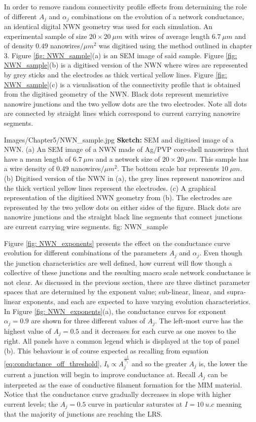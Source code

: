 In order to remove random connectivity profile effects from determining the role of different $A_j$ and $\alpha_j$ combinations on the evolution of a network conductance, an identical digital NWN geometry was used for each simulation. An experimental sample of size $ 20\times 20~ \mu m$ with wires of average length $6.7 ~ \mu m $ and of density $0.49$ nanowires$/\mu m^2$ was digitised using the method outlined in chapter 3. Figure \ref{fig: NWN_sample}(a) is an SEM image of said sample. Figure \ref{fig: NWN_sample}(b) is a digitised version of the NWN where wires are represented by grey sticks and the electrodes as thick vertical yellow lines. Figure \ref{fig: NWN_sample}(c) is a visualisation of the connectivity profile that is obtained from the digitised geometry of the NWN. Black dots represent memristive nanowire junctions and the two yellow dots are the two electrodes. Note all dots are connected by straight lines which correspond to current carrying nanowire segments.

{Images/Chapter5/NWN_sample.jpg}
{\textbf{Sketch:} SEM and digitised image of a NWN.}
{(a) An SEM image of a NWN made of Ag/PVP core-shell nanowires that have a mean length of $ 6.7~ \mu m$ and a network size of $20 \times 20~ \mu m$. This sample has a wire density of $0.49$ nanowires$/\mu m^2$. The bottom scale bar represents $10~ \mu m$. (b) Digitised version of the NWN in (a), the grey lines represent nanowires and the thick vertical yellow lines represent the electrodes. (c) A graphical representation of the digitised NWN geometry from (b). The electrodes are represented by the two yellow dots on either sides of the figure. Black dots are nanowire junctions and the straight black line segments that connect junctions are current carrying wire segments.}
{fig: NWN_sample}

Figure \ref{fig: NWN_exponents} presents the effect on the conductance curve evolution for different combinations of the parameters $A_j$ and $\alpha_j$. Even though the junction characteristics are well defined, how current will flow though a collective of these junctions and the resulting macro scale network conductance is not clear. As discussed in the previous section, there are three distinct parameter spaces that are determined by the exponent value; sub-linear, linear, and supra-linear exponents, and each are expected to have varying evolution characteristics. In Figure \ref{fig: NWN_exponents}(a), the conductance curves for exponent $\alpha_j= 0.9$ are shown for three different values of $A_j$. The left-most curve has the highest value of $A_j = 0.5$ and it decreases for each curve as one moves to the right. All panels have a common legend which is displayed at the top of panel (b). This behaviour is of course expected as recalling from equation \ref{eq:conductance_off_threshold}, $I_b \propto A_j^{\frac{-1}{\alpha_j}}$ and so the greater $A_j$ is, the lower the current a junction will begin to improve conductance at. Recall $A_j$ can be interpreted as the ease of conductive filament formation for the MIM material. Notice that the conductance curve gradually decreases in slope with higher current levels; the $A_j = 0.5$ curve in particular saturates at $I = 10 ~ u.c$ meaning that the majority of junctions are reaching the LRS.

